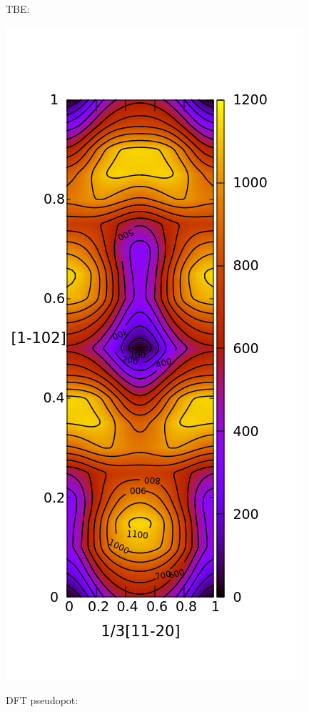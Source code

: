 \documentclass[11pt]{article}
\begin{document}
TBE:
\begin{center}
\includegraphics[width=.9\linewidth]{Images/pyramidal_gamma_surface_final_model_contours.png}
\end{center}
DFT pseudopot:
\end{document}
